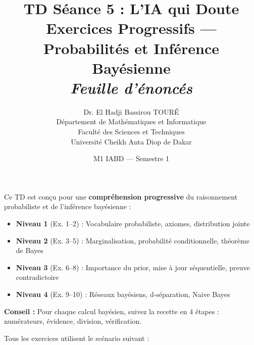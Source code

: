 \documentclass[11pt,a4paper]{article}
\title{\textbf{TD Séance 5 : L'IA qui Doute}\\
\large Exercices Progressifs --- Probabilités et Inférence Bayésienne\\[0.3cm]
\normalsize \textit{Feuille d'énoncés}}
\author{Dr. El Hadji Bassirou TOURÉ\\
Département de Mathématiques et Informatique\\
Faculté des Sciences et Techniques\\
Université Cheikh Anta Diop de Dakar}
\date{M1 IABD --- Semestre 1}
\begin{document}
\maketitle

\begin{rappelbox}[Organisation de ce TD]
Ce TD est conçu pour une \textbf{compréhension progressive} du raisonnement probabiliste et de l'inférence bayésienne :

\begin{itemize}[nosep]
    \item \textbf{Niveau 1} (Ex. 1--2) : Vocabulaire probabiliste, axiomes, distribution jointe
    \item \textbf{Niveau 2} (Ex. 3--5) : Marginalisation, probabilité conditionnelle, théorème de Bayes
    \item \textbf{Niveau 3} (Ex. 6--8) : Importance du prior, mise à jour séquentielle, preuve contradictoire
    \item \textbf{Niveau 4} (Ex. 9--10) : Réseaux bayésiens, d-séparation, Naive Bayes
\end{itemize}

\textbf{Conseil :} Pour chaque calcul bayésien, suivez la recette en 4 étapes : numérateurs, évidence, division, vérification.
\end{rappelbox}

\vspace{0.3cm}


Tous les exercices utilisent le scénario suivant :
\end{document}
